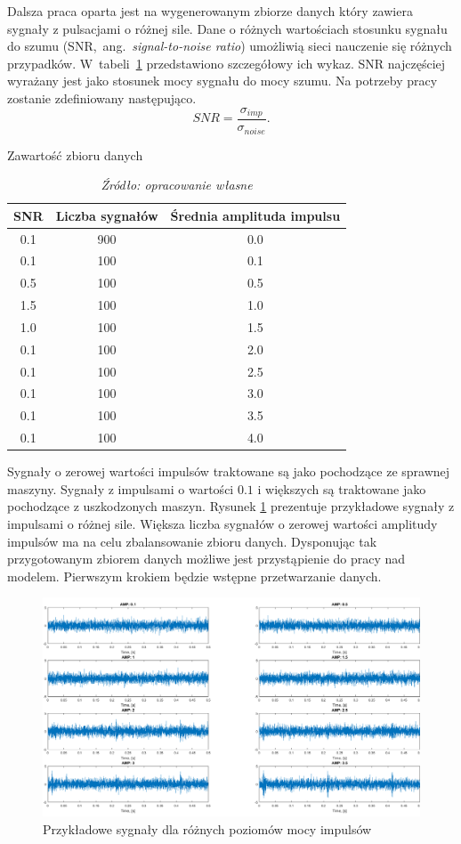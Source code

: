 \documentclass[inzynierska]{pwr_wmat_praca_dyplomowa}
\theoremstyle{plain}
\numberwithin{theorem}{chapter}
\theoremstyle{definition}
\numberwithin{theorem}{chapter}
\begin{document}
Dalsza praca oparta jest na wygenerowanym zbiorze danych który zawiera sygnały z pulsacjami o różnej sile. Dane o różnych wartościach stosunku sygnału do szumu (SNR,~ang.~\textit{signal-to-noise ratio}) umożliwią sieci nauczenie się różnych przypadków. W~tabeli~\ref{tab:dataset} przedstawiono szczegółowy ich wykaz. SNR najczęściej wyrażany jest jako stosunek mocy sygnału do mocy szumu\cite{johnson2006signal}. Na potrzeby pracy zostanie zdefiniowany następująco.
\begin{equation}
	SNR = \frac{\sigma_{imp}}{\sigma_{noise}}.
\end{equation}
\begin{table}[H]
	\caption{Zawartość zbioru danych}
	\centering
	\begin{tabular}{ccc}
		\hline
		\hline                       
		SNR & Liczba sygnałów & {\'S}rednia amplituda impulsu \rule{0pt}{2.6ex}  \\  [0.5ex] 
		\hline 
		0.1 & 900 & 0.0  \\
		0.1 & 100 & 0.1  \\
		0.5 & 100 & 0.5  \\
		1.5 & 100 & 1.0  \\
		1.0 & 100 & 1.5  \\
		0.1 & 100 & 2.0  \\
		0.1 & 100 & 2.5  \\
		0.1 & 100 & 3.0  \\
		0.1 & 100 & 3.5  \\
		0.1 & 100 & 4.0  \\ 
		\hline 
	\end{tabular}
	\caption*{\textit{Źródło: opracowanie własne}}
	\label{tab:dataset} 
\end{table}
Sygnały o zerowej wartości impulsów traktowane są jako pochodzące ze sprawnej maszyny. Sygnały z impulsami o wartości $0.1$ i większych są traktowane jako pochodzące z uszkodzonych maszyn. Rysunek \ref{pulsacje} prezentuje przykładowe sygnały z impulsami o różnej sile. Większa liczba sygnałów o zerowej wartości amplitudy impulsów ma na celu zbalansowanie zbioru danych.
Dysponując tak przygotowanym zbiorem danych możliwe jest przystąpienie do pracy nad modelem. Pierwszym krokiem będzie wstępne przetwarzanie danych. 

\begin{figure}[ht]
	\centering
	\includegraphics[width=16cm]{images/pulsacje.png}
	\caption{Przykładowe sygnały dla różnych poziomów mocy impulsów}
	\label{pulsacje}
\end{figure}
\end{document}
